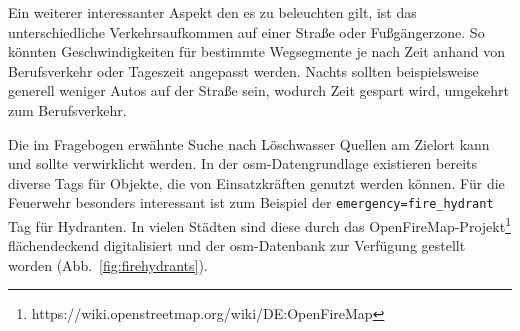 Ein weiterer interessanter Aspekt den es zu beleuchten gilt, ist das unterschiedliche Verkehrsaufkommen auf einer Straße oder Fußgängerzone.
So könnten Geschwindigkeiten für bestimmte Wegsegmente je nach Zeit anhand von Berufsverkehr oder Tageszeit angepasst werden.
Nachts sollten beispielsweise generell weniger Autos auf der Straße sein, wodurch Zeit gespart wird, umgekehrt zum Berufsverkehr.

Die im Fragebogen erwähnte Suche nach Löschwasser Quellen am Zielort kann und sollte verwirklicht werden.
In der \gls{osm}-Datengrundlage existieren bereits diverse Tags für Objekte, die von Einsatzkräften genutzt werden können.
Für die Feuerwehr besonders interessant ist zum Beispiel der \texttt{emergency=fire\_hydrant} Tag für Hydranten.
In vielen Städten sind diese durch das OpenFireMap-Projekt\footnote{https://wiki.openstreetmap.org/wiki/DE:OpenFireMap} flächendeckend digitalisiert und der \gls{osm}-Datenbank zur Verfügung gestellt worden (Abb.~\ref{fig:firehydrants}).